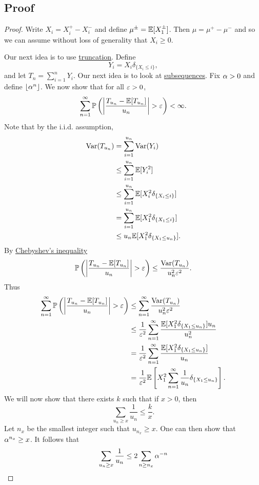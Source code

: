 \subsection{Proof}
\begin{proof}
    Write $X_i = X_i^+-X_i^-$ and define $\mu^{\pm} = {\mathbb{E}}[X_1^\pm]$. Then $\mu = \mu^+ - \mu^-$ and so we can assume without loss of generality that $X_i \ge 0$.

    Our next idea is to use \underline{truncation}. Define
    \[Y_i = X_i \delta_{\{X_i \le i\}}, \]
    and let $T_n = \sum_{i=1}^n Y_i$. Our next idea is to look at \underline{subsequences}. Fix ${\alpha} >0$ and define $\lfloor {\alpha}^n \rfloor$. We now show that for all $\varepsilon > 0$,
    \[\sum_{n=1}^\infty {\mathbb{P}}\left({\left\lvert\frac{T_{u_n}-{\mathbb{E}}[T_{u_n}]}{u_n}\right\rvert}>\varepsilon \right)< \infty. \] 
    Note that by the i.i.d. assumption,
    \begin{align*}
        \operatorname{Var}(T_{u_n})&=\sum_{i=1}^{u_n}\operatorname{Var}(Y_i)\\
        &\le \sum_{i=1}^{u_n}{\mathbb{E}}[Y_i^2]\\
        &\le \sum_{i=1}^{u_n}{\mathbb{E}}[X_i^2\delta_{\{X_i \le i\}}]\\
        &=\sum_{i=1}^{u_n}{\mathbb{E}}[X_1^2\delta_{\{X_1 \le i\}}]\\
        &\le u_n {\mathbb{E}}[X_1^2 \delta_{\{X_1\le u_n\}}].
    \end{align*}
    By \underline{Chebyshev's inequality} 
    \[{\mathbb{P}}\left({\left\lvert\frac{T_{u_n}-{\mathbb{E}}[T_{u_n}]}{u_n}\right\rvert}>\varepsilon \right) \le \frac{\operatorname{Var}(T_{u_n})}{u_n^2\varepsilon^2}. \]
    Thus 
    \begin{align*}
        \sum_{n=1}^\infty {\mathbb{P}}\left({\left\lvert\frac{T_{u_n}-{\mathbb{E}}[T_{u_n}]}{u_n}\right\rvert}>\varepsilon \right)&\le \sum_{n=1}^\infty  \frac{\operatorname{Var}(T_{u_n})}{u_n^2\varepsilon^2}\\
        &\le \frac{1}{\varepsilon^2}\sum_{n=1}^\infty \frac{{\mathbb{E}}[X_1^2\delta_{\{X_1\le u_n\}}]u_n}{u_n^2}\\
        & =  \frac{1}{\varepsilon^2}\sum_{n=1}^\infty \frac{{\mathbb{E}}[X_1^2\delta_{\{X_1\le u_n\}}]}{u_n}\\
        &=\frac{1}{\varepsilon^2}{\mathbb{E}}\left[X_1^2 \sum_{n=1}^\infty \frac{1}{u_n}\delta_{\{X_1\le u_n\}}\right].
    \end{align*}
    We will now show that there exists $k$ such that if $x > 0$, then 
    \[\sum_{u_n \ge x}\frac{1}{u_n} \le \frac{k}{x}. \]
    Let $n_x$ be the smallest integer such that $u_{n_x} \ge x$. One can then show that ${\alpha}^{n_x} \ge x$. It follows that
    \begin{align*}
        \sum_{u_n \ge x} \frac{1}{u_n} &\le 2 \sum_{n \ge n_x} \al^{-n}\\

\end{align*}
\end{proof}
